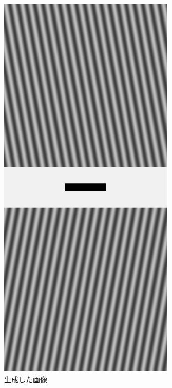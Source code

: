 \begin{figure}[h]
\begin{minipage}[b]{.19\textwidth}
        \includegraphics[keepaspectratio,width=.6\textwidth]{../../Figures/07_23_dg10.pdf}
    \end{minipage}
    \caption{生成した画像}
\end{figure}
